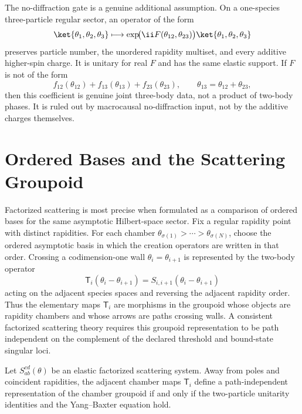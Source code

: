 \begin{remark}
\label{rem:elastic-support-without-pairwise-factorization}
The no-diffraction gate is a genuine additional assumption.  On a one-species
three-particle regular sector, an operator of the form
\[
  \ket{\theta_1,\theta_2,\theta_3}
  \longmapsto
  \exp\!\bigl(\ii F(\theta_{12},\theta_{23})\bigr)
  \ket{\theta_1,\theta_2,\theta_3}
\]
preserves particle number, the unordered rapidity multiset, and every additive
higher-spin charge.  It is unitary for real \(F\) and has the same elastic
support.  If \(F\) is not of the form
\[
  f_{12}(\theta_{12})+f_{13}(\theta_{13})+f_{23}(\theta_{23}),
  \qquad \theta_{13}=\theta_{12}+\theta_{23},
\]
then this coefficient is genuine joint three-body data, not a product of
two-body phases.  It is ruled out by macrocausal no-diffraction input, not by
the additive charges themselves.
\end{remark}

\section{Ordered Bases and the Scattering Groupoid}

Factorized scattering is most precise when formulated as a comparison of
ordered bases for the same asymptotic Hilbert-space sector.  Fix a regular
rapidity point with distinct rapidities.  For each chamber
\(\theta_{\sigma(1)}>\cdots>\theta_{\sigma(N)}\), choose the ordered
asymptotic basis in which the creation operators are written in that order.
Crossing a codimension-one wall \(\theta_i=\theta_{i+1}\) is represented by
the two-body operator
\[
  \mathsf T_i(\theta_i-\theta_{i+1})
  =
  S_{i,i+1}(\theta_i-\theta_{i+1})
\]
acting on the adjacent species spaces and reversing the adjacent rapidity
order.  Thus the elementary maps \(\mathsf T_i\) are morphisms in the groupoid
whose objects are rapidity chambers and whose arrows are paths crossing
walls.  A consistent factorized scattering theory requires this groupoid
representation to be path independent on the complement of the declared
threshold and bound-state singular loci.

\begin{proposition}
\label{prop:scattering-chamber-consistency}
Let \(S_{ab}^{cd}(\theta)\) be an elastic factorized scattering system.  Away
from poles and coincident rapidities, the adjacent chamber maps
\(\mathsf T_i\) define a path-independent representation of the chamber
groupoid if and only if the two-particle unitarity identities and the
Yang--Baxter equation hold.
\end{proposition}

